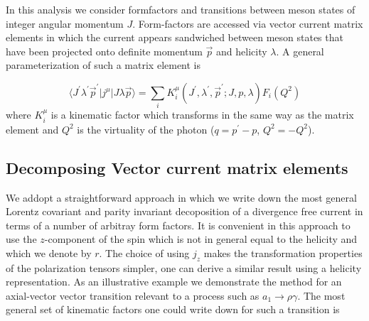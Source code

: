 In this analysis we consider formfactors and transitions between meson states of integer angular momentum $J$. Form-factors are accessed via vector current matrix elements in which the current appears sandwiched between meson states  that have been projected onto definite momentum $\vec{p}$ and helicity $\lambda$.  A general parameterization of such a matrix element is 

\begin{equation*}
\langle  J^\prime\lambda^\prime\vec{p}^\prime | j^\mu | J \lambda \vec{p} \rangle = \sum_i K^\mu_i(J^\prime,\lambda^\prime,\vec{p}^\prime;J,p,\lambda)F_i(Q^2) \label{eqn::genericDecomposition}
\end{equation*}
where $K^{\mu}_i$ is a kinematic factor which transforms in the same way as the matrix element and $Q^2$ is the virtuality of the photon ($q = p^\prime -p$, $Q^2 = -Q^2$). 

\subsection{Decomposing Vector current matrix elements}

We addopt a straightforward approach in which we write down the most general Lorentz covariant and parity invariant decoposition of a divergence free current in terms of a number of arbitray form factors. It is convenient in this approach to use the $z$-component of the spin which is not in general equal to the helicity and which we denote by $r$. The choice of using $j_z$ makes the transformation properties of the polarization tensors simpler, one can derive a similar result using a helicity representation. As an illustrative example we demonstrate the method for an axial-vector vector transition relevant to a process such as $a_1 \rightarrow \rho \gamma$.   The most general set of kinematic factors one could write down for such a transition is 

